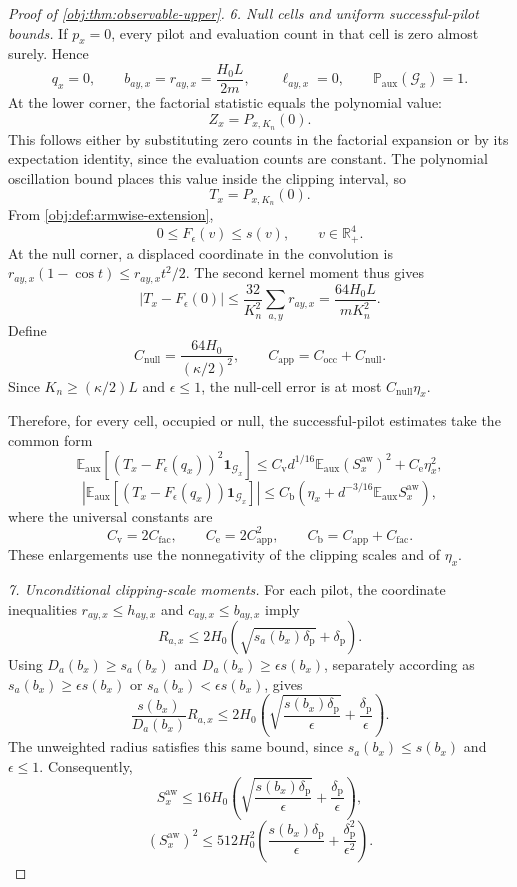 \begin{proof}[Proof of \cref{obj:thm:observable-upper}]
\textit{6. Null cells and uniform successful-pilot bounds.}
If \(p_x=0\), every pilot and evaluation count in that cell is zero almost surely. Hence
\[
q_x=0,\qquad
b_{ay,x}=r_{ay,x}=\frac{H_0L}{2m},\qquad
\ell_{ay,x}=0,
\qquad
\mathbb P_{\mathrm{aux}}(\mathcal G_x)=1.
\]
At the lower corner, the factorial statistic equals the polynomial value:
\[
Z_x=P_{x,K_n}(0).
\]
This follows either by substituting zero counts in the factorial expansion or by its expectation identity, since the evaluation counts are constant. The polynomial oscillation bound places this value inside the clipping interval, so
\[
T_x=P_{x,K_n}(0).
\]
From \cref{obj:def:armwise-extension},
\[
0\le F_\epsilon(v)\le s(v),\qquad v\in\mathbb R_+^4.
\]
At the null corner, a displaced coordinate in the convolution is
\(r_{ay,x}(1-\cos t)\le r_{ay,x}t^2/2\). The second kernel moment thus gives
\[
|T_x-F_\epsilon(0)|
\le\frac{32}{K_n^2}\sum_{a,y}r_{ay,x}
=\frac{64H_0L}{mK_n^2}.
\]
Define
\[
C_{\mathrm{null}}=\frac{64H_0}{(\kappa/2)^2},
\qquad
C_{\mathrm{app}}=C_{\mathrm{occ}}+C_{\mathrm{null}}.
\]
Since \(K_n\ge(\kappa/2)L\) and \(\epsilon\le1\), the null-cell error is at most \(C_{\mathrm{null}}\eta_x\).

Therefore, for every cell, occupied or null, the successful-pilot estimates take the common form
\[
\mathbb E_{\mathrm{aux}}
[(T_x-F_\epsilon(q_x))^2\mathbf1_{\mathcal G_x}]
\le
C_{\mathrm v}d^{1/16}
\mathbb E_{\mathrm{aux}}(S_x^{\mathrm{aw}})^2
+C_{\mathrm e}\eta_x^2,
\]
\[
\left|
\mathbb E_{\mathrm{aux}}
[(T_x-F_\epsilon(q_x))\mathbf1_{\mathcal G_x}]
\right|
\le
C_{\mathrm b}
\left(\eta_x+d^{-3/16}\mathbb E_{\mathrm{aux}}S_x^{\mathrm{aw}}\right),
\]
where the universal constants are
\[
C_{\mathrm v}=2C_{\mathrm{fac}},\qquad
C_{\mathrm e}=2C_{\mathrm{app}}^2,\qquad
C_{\mathrm b}=C_{\mathrm{app}}+C_{\mathrm{fac}}.
\]
These enlargements use the nonnegativity of the clipping scales and of \(\eta_x\).

\textit{7. Unconditional clipping-scale moments.}
For each pilot, the coordinate inequalities \(r_{ay,x}\le h_{ay,x}\) and \(c_{ay,x}\le b_{ay,x}\) imply
\[
R_{a,x}
\le2H_0\left(\sqrt{s_a(b_x)\delta_{\mathrm p}}+\delta_{\mathrm p}\right).
\]
Using \(D_a(b_x)\ge s_a(b_x)\) and
\(D_a(b_x)\ge\epsilon s(b_x)\), separately according as
\(s_a(b_x)\ge\epsilon s(b_x)\) or
\(s_a(b_x)<\epsilon s(b_x)\), gives
\[
\frac{s(b_x)}{D_a(b_x)}R_{a,x}
\le
2H_0\left(
\sqrt{\frac{s(b_x)\delta_{\mathrm p}}{\epsilon}}
+\frac{\delta_{\mathrm p}}{\epsilon}
\right).
\]
The unweighted radius satisfies this same bound, since
\(s_a(b_x)\le s(b_x)\) and \(\epsilon\le1\). Consequently,
\[
S_x^{\mathrm{aw}}
\le16H_0\left(
\sqrt{\frac{s(b_x)\delta_{\mathrm p}}{\epsilon}}
+\frac{\delta_{\mathrm p}}{\epsilon}
\right),
\]
\[
(S_x^{\mathrm{aw}})^2
\le512H_0^2\left(
\frac{s(b_x)\delta_{\mathrm p}}{\epsilon}
+\frac{\delta_{\mathrm p}^2}{\epsilon^2}
\right).
\]


\end{proof}
